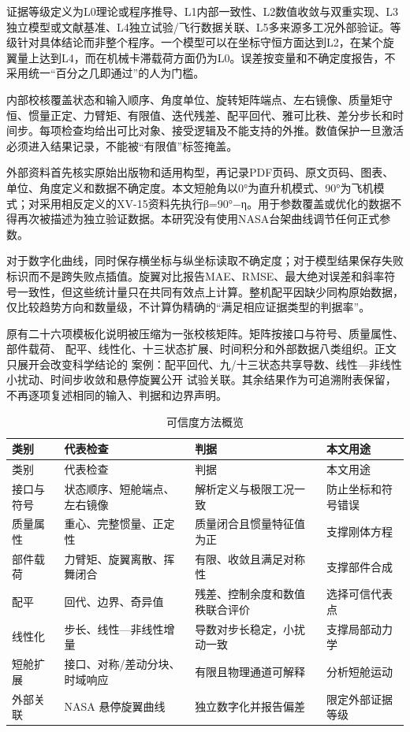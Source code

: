 \documentclass[UTF8,12pt,oneside,openany,fontset=windows]{ctexbook}
\begin{document}
证据等级定义为L0理论或程序推导、L1内部一致性、L2数值收敛与双重实现、L3独立模型或文献基准、L4独立试验/飞行数据关联、L5多来源多工况外部验证。等级针对具体结论而非整个程序。一个模型可以在坐标守恒方面达到L2，在某个旋翼量上达到L4，而在机械卡滞载荷方面仍为L0。误差按变量和不确定度报告，不采用统一“百分之几即通过”的人为门槛。

内部校核覆盖状态和输入顺序、角度单位、旋转矩阵端点、左右镜像、质量矩守恒、惯量正定、力臂矩、有限值、迭代残差、配平回代、雅可比秩、差分步长和时间步。每项检查均给出可比对象、接受逻辑及不能支持的外推。数值保护一旦激活必须进入结果记录，不能被“有限值”标签掩盖。

外部资料首先核实原始出版物和适用构型，再记录PDF页码、原文页码、图表、单位、角度定义和数据不确定度。本文短舱角以0°为直升机模式、90°为飞机模式；对采用相反定义的XV-15资料先执行β=90°−η。用于参数覆盖或优化的数据不得再次被描述为独立验证数据。本研究没有使用NASA台架曲线调节任何正式参数。

对于数字化曲线，同时保存横坐标与纵坐标读取不确定度；对于模型结果保存失败标识而不是跨失败点插值。旋翼对比报告MAE、RMSE、最大绝对误差和斜率符号一致性，但这些统计量只在共同有效点上计算。整机配平因缺少同构原始数据，仅比较趋势方向和数量级，不计算伪精确的“满足相应证据类型的判据率”。

原有二十六项模板化说明被压缩为一张校核矩阵。矩阵按接口与符号、质量属性、部件载荷、 配平、线性化、十三状态扩展、时间积分和外部数据八类组织。正文只展开会改变科学结论的 案例：配平回代、九/十三状态共享导数、线性—非线性小扰动、时间步收敛和悬停旋翼公开 试验关联。其余结果作为可追溯附表保留，不再逐项复述相同的输入、判据和边界声明。

\begin{center}
\scriptsize
\setlength{\tabcolsep}{1pt}
\begin{longtable}{>{\raggedright\arraybackslash}p{}>{\raggedright\arraybackslash}p{}>{\raggedright\arraybackslash}p{}>{\raggedright\arraybackslash}p{}}
\caption{可信度方法概览}\\
\toprule
类别 & 代表检查 & 判据 & 本文用途 \\
\midrule\endfirsthead
\toprule
类别 & 代表检查 & 判据 & 本文用途 \\
\midrule\endhead
接口与符号 & 状态顺序、短舱端点、左右镜像 & 解析定义与极限工况一致 & 防止坐标和符号错误 \\
质量属性 & 重心、完整惯量、正定性 & 质量闭合且惯量特征值为正 & 支撑刚体方程 \\
部件载荷 & 力臂矩、旋翼离散、挥舞闭合 & 有限、收敛且满足对称性 & 支撑部件合成 \\
配平 & 回代、边界、奇异值 & 残差、控制余度和数值秩联合评价 & 选择可信代表点 \\
线性化 & 步长、线性—非线性增量 & 导数对步长稳定，小扰动一致 & 支撑局部动力学 \\
短舱扩展 & 接口、对称/差动分块、时域响应 & 有限且物理通道可解释 & 分析短舱运动 \\
外部关联 & NASA 悬停旋翼曲线 & 独立数字化并报告偏差 & 限定外部证据等级 \\
\bottomrule
\end{longtable}
\end{center}
\end{document}
